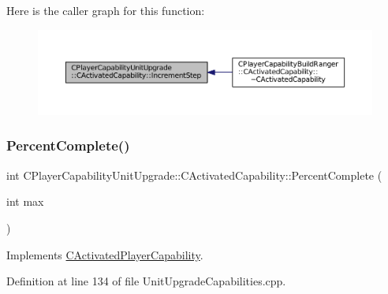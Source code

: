 Here is the caller graph for this function\+:
\nopagebreak
\begin{figure}[H]
\begin{center}
\leavevmode
\includegraphics[width=350pt]{classCPlayerCapabilityUnitUpgrade_1_1CActivatedCapability_a86833312cb2f2460e923808fe0e19223_icgraph}
\end{center}
\end{figure}
\hypertarget{classCPlayerCapabilityUnitUpgrade_1_1CActivatedCapability_a16026f30b1ec10fbd4cb7049d0b74719}{}\label{classCPlayerCapabilityUnitUpgrade_1_1CActivatedCapability_a16026f30b1ec10fbd4cb7049d0b74719} 
\subsubsection{\texorpdfstring{Percent\+Complete()}{PercentComplete()}}
{\footnotesize\ttfamily int C\+Player\+Capability\+Unit\+Upgrade\+::\+C\+Activated\+Capability\+::\+Percent\+Complete (\begin{DoxyParamCaption}\item[{int}]{max }\end{DoxyParamCaption})\hspace{0.3cm}{\ttfamily [virtual]}}



Implements \hyperlink{classCActivatedPlayerCapability_a405dc6076058006a4f801727de4cfe4d}{C\+Activated\+Player\+Capability}.



Definition at line 134 of file Unit\+Upgrade\+Capabilities.\+cpp.


